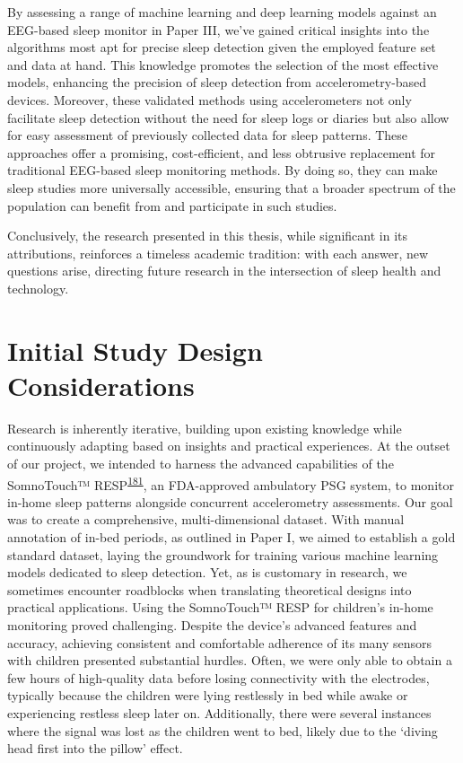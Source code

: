 \documentclass[
  10pt,
]{scrbook}
\begin{document}
By assessing a range of machine learning and deep learning models
against an EEG-based sleep monitor in Paper III, we've gained critical
insights into the algorithms most apt for precise sleep detection given
the employed feature set and data at hand. This knowledge promotes the
selection of the most effective models, enhancing the precision of sleep
detection from accelerometry-based devices. Moreover, these validated
methods using accelerometers not only facilitate sleep detection without
the need for sleep logs or diaries but also allow for easy assessment of
previously collected data for sleep patterns. These approaches offer a
promising, cost-efficient, and less obtrusive replacement for
traditional EEG-based sleep monitoring methods. By doing so, they can
make sleep studies more universally accessible, ensuring that a broader
spectrum of the population can benefit from and participate in such
studies.

Conclusively, the research presented in this thesis, while significant
in its attributions, reinforces a timeless academic tradition: with each
answer, new questions arise, directing future research in the
intersection of sleep health and technology.

\hypertarget{initial-study-design-considerations}{%
\section{Initial Study Design
Considerations}\label{initial-study-design-considerations}}

Research is inherently iterative, building upon existing knowledge while
continuously adapting based on insights and practical experiences. At
the outset of our project, we intended to harness the advanced
capabilities of the SomnoTouch™️
RESP\textsuperscript{\protect\hyperlink{ref-somnotouch}{181}}, an
FDA-approved ambulatory PSG system, to monitor in-home sleep patterns
alongside concurrent accelerometry assessments. Our goal was to create a
comprehensive, multi-dimensional dataset. With manual annotation of
in-bed periods, as outlined in Paper I, we aimed to establish a gold
standard dataset, laying the groundwork for training various machine
learning models dedicated to sleep detection. Yet, as is customary in
research, we sometimes encounter roadblocks when translating theoretical
designs into practical applications. Using the SomnoTouch™️ RESP for
children's in-home monitoring proved challenging. Despite the device's
advanced features and accuracy, achieving consistent and comfortable
adherence of its many sensors with children presented substantial
hurdles. Often, we were only able to obtain a few hours of high-quality
data before losing connectivity with the electrodes, typically because
the children were lying restlessly in bed while awake or experiencing
restless sleep later on. Additionally, there were several instances
where the signal was lost as the children went to bed, likely due to the
`diving head first into the pillow' effect.
\end{document}
